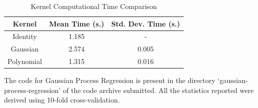 \documentclass[parskip=full]{scrartcl}
\begin{document}
            \begin{table}[ht]
                \centering
                \begin{tabular}{| c | c | c |}
                \hline
                \textbf{Kernel} & \textbf{Mean Time (s.)} & \textbf{Std. Dev. Time (s.)} \\
                \hline
                \hline
                    Identity & 1.185 & - \\
                \hline
                    Gaussian & 2.574 & 0.005 \\
                \hline
                    Polynomial & 1.315 & 0.016 \\
                \hline
                \end{tabular}
                \caption{Kernel Computational Time Comparison}
                \label{tab:kernel_computational_time_comparison}
            \end{table}

        

        The code for Gaussian Process Regression is present in the directory `gaussian-process-regression' of the code archive submitted. All the statistics reported were derived using 10-fold cross-validation.
    

\end{document}
